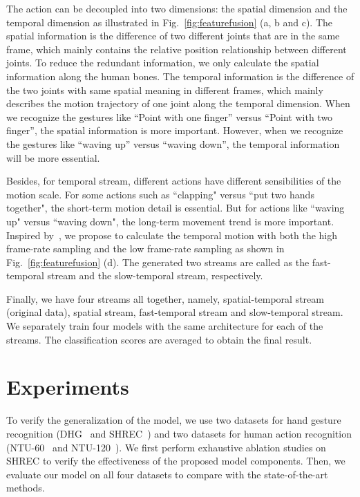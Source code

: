 \documentclass[runningheads]{llncs}
\begin{document}
The action can be decoupled into two dimensions: the spatial dimension and the temporal dimension as illustrated in Fig.~\ref{fig:featurefusion} (a, b and c). 
The spatial information is the difference of two different  joints that are in the same frame, which mainly contains the relative position relationship between different joints. 
To reduce the redundant information, we only calculate the spatial information along the human bones. 
The temporal information is the difference of the two joints with same spatial meaning in different frames, which mainly describes the motion trajectory of one joint along the temporal dimension. 
When we recognize the gestures like ``Point with one finger'' versus ``Point with two finger'', the spatial information is more important. 
However, when we recognize the gestures like ``waving up'' versus ``waving down'', the temporal information will be more essential. 



Besides, for temporal stream, different actions have different sensibilities of the motion scale. 
For some actions such as ``clapping" versus ``put two hands together", the short-term motion detail is essential. But for actions like ``waving up" versus ``waving down", the long-term movement trend is more important. 
Inspired by~\cite{feichtenhofer_slowfast_2019}, we propose to calculate the temporal motion with both the high frame-rate sampling and the low frame-rate sampling as shown in Fig.~\ref{fig:featurefusion} (d). 
The generated two streams are called as the fast-temporal stream and the slow-temporal stream, respectively. 

Finally, we have four streams all together, namely, spatial-temporal stream (original data), spatial stream, fast-temporal stream and slow-temporal stream. 
We separately train four models with the same architecture for each of the streams. 
The classification scores are averaged to obtain the final result.



\section{Experiments}
To verify the generalization of the model, we use two datasets for hand gesture recognition (DHG~\cite{de_smedt_skeleton-based_2016} and SHREC~\cite{de_smedt_shrec17_2017}) and two datasets for human action recognition (NTU-60~\cite{shahroudy_ntu_2016} and NTU-120~\cite{liu_ntu_2019}). We first perform exhaustive ablation studies on SHREC to verify the effectiveness of the proposed model components. Then, we evaluate our model on all four datasets to compare with the state-of-the-art methods.
\end{document}
